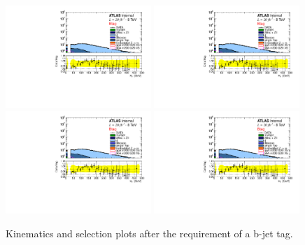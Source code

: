 \begin{figure}[htp]
     \begin{center}

           \includegraphics[page=1, width=0.49\textwidth]{figure/appendix/std_plots_Btag.pdf}
            \includegraphics[page=2, width=0.49\textwidth]{figure/appendix/std_plots_Btag.pdf}
            \includegraphics[page=3, width=0.49\textwidth]{figure/appendix/std_plots_Btag.pdf}
            \includegraphics[page=4, width=0.49\textwidth]{figure/appendix/std_plots_Btag.pdf}

    \end{center}
    \caption{Kinematics and selection plots after the requirement of a b-jet tag.}
\end{figure}

